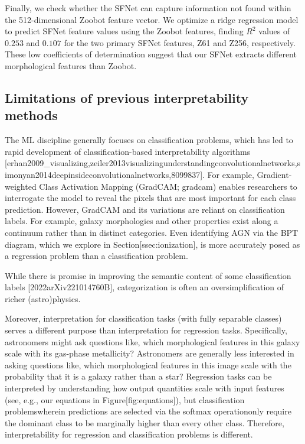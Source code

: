 \documentclass[11pt,a4paper]{article}
\begin{document}
Finally, we check whether the SFNet can capture information not found within the 512-dimensional Zoobot feature vector. We optimize a ridge regression model to predict SFNet feature values  using the Zoobot features, finding  $R^2$  values of  $0.253$  and  $0.107$  for the two primary SFNet features, Z61 and Z256, respectively. These low coefficients of determination suggest that our SFNet extracts different morphological features than Zoobot.

\subsection{Limitations of previous interpretability methods}

The ML discipline generally focuses on classification problems, which has led to rapid development of classification-based interpretability algorithms [erhan2009\_visualizing,zeiler2013visualizingunderstandingconvolutionalnetworks,simonyan2014deepinsideconvolutionalnetworks,8099837]. For example, Gradient-weighted Class Activation Mapping (GradCAM; gradcam) enables researchers to interrogate the model to reveal the pixels that are most important for each class prediction. However, GradCAM and its variations are reliant on classification labels. For example, galaxy morphologies and other properties exist along a continuum rather than in distinct categories. Even identifying AGN via the BPT diagram, which we explore in Section[ssec:ionization], is more accurately posed as a regression problem than a classification problem.

While there is promise in improving the semantic content of some classification labels [2022arXiv221014760B], categorization is often an oversimplification of richer (astro)physics.

Moreover, interpretation for classification tasks (with fully separable classes) serves a different purpose than interpretation for regression tasks. Specifically, astronomers might ask questions like, which morphological features in this galaxy scale with its gas-phase metallicity? Astronomers are generally less interested in asking questions like, which morphological features in this image scale with the probability that it is a galaxy rather than a star? Regression tasks can be interpreted by understanding how output quantities scale with input features (see, e.g., our equations in Figure[fig:equations]), but classification problemswherein predictions are selected via the softmax operationonly require the dominant class to be marginally higher than every other class. Therefore, interpretability for regression and classification problems is different.
\end{document}
